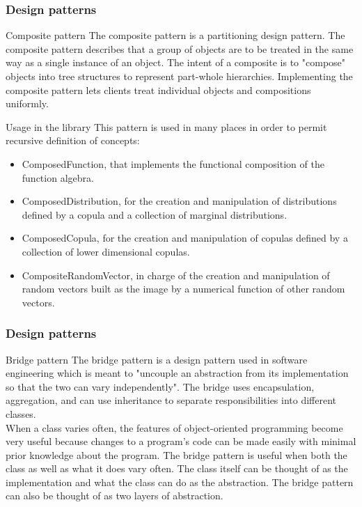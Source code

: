 \documentclass[8pt]{beamer}
\begin{document}
\begin{frame}
  \frametitle{Design patterns}
  \begin{block}{Composite pattern}
    The \alert{composite pattern} is a partitioning design pattern. The composite pattern describes that a group of objects are to be treated in the same way as a single instance of an object. The intent of a composite is to "compose" objects into tree structures to represent part-whole hierarchies. Implementing the composite pattern lets clients treat individual objects and compositions uniformly.
  \end{block}
  \begin{block}{Usage in the library}
    This pattern is used in many places in order to permit recursive definition of concepts:
    \begin{itemize}
    \item \alert{ComposedFunction}, that implements the functional composition of the function algebra.
    \item \alert{ComposedDistribution}, for the creation and manipulation of distributions defined by a copula and a collection of marginal distributions.
    \item \alert{ComposedCopula}, for the creation and manipulation of copulas defined by a collection of lower dimensional copulas.
    \item \alert{CompositeRandomVector}, in charge of the creation and manipulation of random vectors built as the image by a numerical function of other random vectors.
    \end{itemize}
  \end{block}
\end{frame}
\begin{frame}
  \frametitle{Design patterns}
  \begin{block}{Bridge pattern}
    The \alert{bridge pattern} is a design pattern used in software engineering which is meant to "uncouple an abstraction from its implementation so that the two can vary independently". The bridge uses encapsulation, aggregation, and can use inheritance to separate responsibilities into different classes.\\
    When a class varies often, the features of object-oriented programming become very useful because changes to a program's code can be made easily with minimal prior knowledge about the program. The bridge pattern is useful when both the class as well as what it does vary often. The class itself can be thought of as the implementation and what the class can do as the abstraction. The bridge pattern can also be thought of as two layers of abstraction.
  \end{block}
\end{frame}
\end{document}
